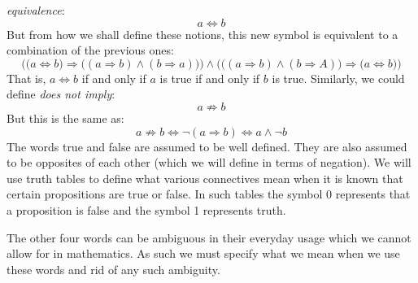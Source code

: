     \textit{equivalence}:
    \begin{equation*}
        a\Leftrightarrow{b}
    \end{equation*}
    But from how we shall define these notions, this new symbol is equivalent to
    a combination of the previous ones:
    \begin{equation*}
        \Big(\big(a\Leftrightarrow{b}\big)\Rightarrow
             \big((a\Rightarrow{b})\land(b\Rightarrow{a})\big)\Big)
        \land\Big(\big((a\Rightarrow{b})\land(b\Rightarrow{A})\big)
            \Rightarrow\big(a\Leftrightarrow{b}\big)\Big)
    \end{equation*}
    That is, $a\Leftrightarrow{b}$ if and only if $a$ is true if and only if $b$
    is true. Similarly, we could define \textit{does not imply}:
    \begin{equation*}
        a\not\Rightarrow{b}
    \end{equation*}
    But this is the same as:
    \begin{equation*}
        a\not\Rightarrow{b}\Longleftrightarrow
        \neg(a\Rightarrow{b})
        \Longleftrightarrow
        a\land\neg{b}
    \end{equation*}
    The words true and false are assumed to be well defined. They are also
    assumed to be opposites of each other (which we will define in terms of
    negation). We will use truth tables to define what
    various connectives mean when it is known that certain propositions are true
    or false. In such tables the symbol 0 represents that a proposition is false
    and the symbol 1 represents truth.
    \par\hfill\par
    The other four words can be ambiguous in their everyday usage which we
    cannot allow for in mathematics. As such we must specify what we mean when
    we use these words and rid of any such ambiguity.
